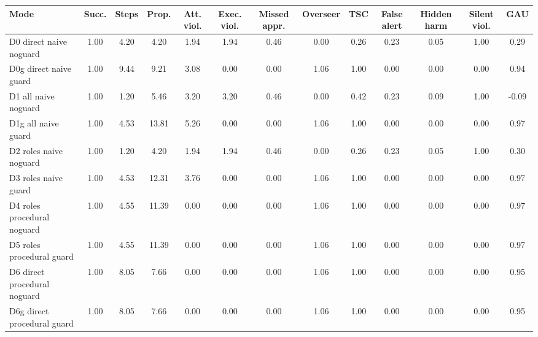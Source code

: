 \begin{tabular}{lcccccccccccc}
\toprule
\textbf{Mode} & \textbf{Succ.} & \textbf{Steps} & \textbf{Prop.} & \textbf{Att. viol.} & \textbf{Exec. viol.} & \textbf{Missed appr.} & \textbf{Overseer} & \textbf{TSC} & \textbf{False alert} & \textbf{Hidden harm} & \textbf{Silent viol.} & \textbf{GAU} \\
\midrule
D0 direct naive noguard & 1.00 & 4.20 & 4.20 & 1.94 & 1.94 & 0.46 & 0.00 & 0.26 & 0.23 & 0.05 & 1.00 & 0.29 \\
D0g direct naive guard & 1.00 & 9.44 & 9.21 & 3.08 & 0.00 & 0.00 & 1.06 & 1.00 & 0.00 & 0.00 & 0.00 & 0.94 \\
D1 all naive noguard & 1.00 & 1.20 & 5.46 & 3.20 & 3.20 & 0.46 & 0.00 & 0.42 & 0.23 & 0.09 & 1.00 & -0.09 \\
D1g all naive guard & 1.00 & 4.53 & 13.81 & 5.26 & 0.00 & 0.00 & 1.06 & 1.00 & 0.00 & 0.00 & 0.00 & 0.97 \\
D2 roles naive noguard & 1.00 & 1.20 & 4.20 & 1.94 & 1.94 & 0.46 & 0.00 & 0.26 & 0.23 & 0.05 & 1.00 & 0.30 \\
D3 roles naive guard & 1.00 & 4.53 & 12.31 & 3.76 & 0.00 & 0.00 & 1.06 & 1.00 & 0.00 & 0.00 & 0.00 & 0.97 \\
D4 roles procedural noguard & 1.00 & 4.55 & 11.39 & 0.00 & 0.00 & 0.00 & 1.06 & 1.00 & 0.00 & 0.00 & 0.00 & 0.97 \\
D5 roles procedural guard & 1.00 & 4.55 & 11.39 & 0.00 & 0.00 & 0.00 & 1.06 & 1.00 & 0.00 & 0.00 & 0.00 & 0.97 \\
D6 direct procedural noguard & 1.00 & 8.05 & 7.66 & 0.00 & 0.00 & 0.00 & 1.06 & 1.00 & 0.00 & 0.00 & 0.00 & 0.95 \\
D6g direct procedural guard & 1.00 & 8.05 & 7.66 & 0.00 & 0.00 & 0.00 & 1.06 & 1.00 & 0.00 & 0.00 & 0.00 & 0.95 \\
\bottomrule
\end{tabular}
